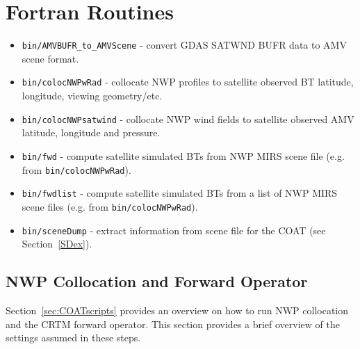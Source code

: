 \documentclass[10pt]{report}
\begin{document}
\section{Fortran Routines}
\begin{itemize}
  \item {\tt bin/AMVBUFR\_to\_AMVScene} - convert GDAS SATWND BUFR data to AMV scene format.
  \item {\tt bin/colocNWPwRad} - collocate NWP profiles to satellite observed BT latitude, longitude, viewing geometry/etc.
  \item {\tt bin/colocNWPsatwind} - collocate NWP wind fields to satellite observed AMV latitude, longitude and pressure.
  \item {\tt bin/fwd} - compute satellite simulated BTs from NWP MIRS scene file (e.g. from {\tt bin/colocNWPwRad}).
  \item {\tt bin/fwdlist} - compute satellite simulated BTs from a list of NWP MIRS scene files (e.g. from {\tt bin/colocNWPwRad}). 
  \item {\tt bin/sceneDump} - extract information from scene file for the COAT (see Section~\ref{SDex}).
\end{itemize}
\subsection{NWP Collocation and Forward Operator}
Section~\ref{sec:COATscripts} provides an overview on how to run NWP collocation and the CRTM forward operator.  This section provides a 
brief overview of the settings assumed in these steps.
\end{document}
